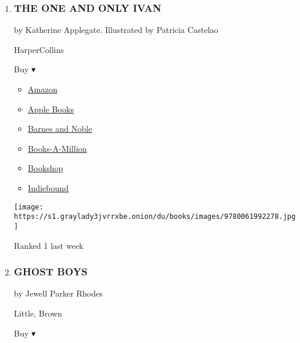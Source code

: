 \begin{enumerate}
\def\labelenumi{\arabic{enumi}.}
\item
  \hypertarget{the-one-and-only-ivan}{%
  \subsubsection{THE ONE AND ONLY IVAN}\label{the-one-and-only-ivan}}

  by Katherine Applegate. Illustrated by Patricia Castelao

  HarperCollins

  Buy ▾

  \begin{itemize}
  \tightlist
  \item
    \href{http://www.amazon.com/The-Only-Ivan-Katherine-Applegate/dp/0061992275?tag=NYTBS-20}{Amazon}
  \item
    \href{https://du-gae-books-dot-nyt-du-prd.appspot.com/buy?title=THE+ONE+AND+ONLY+IVAN\&author=Katherine+Applegate}{Apple
    Books}
  \item
    \href{https://www.anrdoezrs.net/click-7990613-11819508?url=https\%3A\%2F\%2Fwww.barnesandnoble.com\%2Fw\%2F\%3Fean\%3D9780061992278}{Barnes
    and Noble}
  \item
    \href{https://www.anrdoezrs.net/click-7990613-35140?url=https\%3A\%2F\%2Fwww.booksamillion.com\%2Fp\%2FTHE\%2BONE\%2BAND\%2BONLY\%2BIVAN\%2FKatherine\%2BApplegate\%2F9780061992278}{Books-A-Million}
  \item
    \href{https://bookshop.org/a/3546/9780061992278}{Bookshop}
  \item
    \href{https://www.indiebound.org/book/9780061992278?aff=NYT}{Indiebound}
  \end{itemize}

  \texttt{[image: https://s1.graylady3jvrrxbe.onion/du/books/images/9780061992278.jpg]}

  Ranked 1 last week
\item
  \hypertarget{ghost-boys}{%
  \subsubsection{GHOST BOYS}\label{ghost-boys}}

  by Jewell Parker Rhodes

  Little, Brown

  Buy ▾


\end{enumerate}
